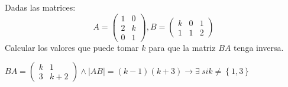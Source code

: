 \documentclass[addpoints,spanish, 12pt,a4paper]{exam}
\begin{document}
\begin{questions}

\question[1] Dadas las matrices:
$$A=\left(\begin{matrix}1 & 0\\2 & k\\0 & 1\end{matrix}\right) ,
 B=\left(\begin{matrix}k & 0 & 1\\1 & 1 & 2\end{matrix}\right)$$
Calcular los valores que puede tomar $k$ para que la matriz $BA$ tenga inversa.
\begin{solution}
$BA=\left(\begin{matrix}k & 1\\3 & k + 2\end{matrix}\right)
 \land |AB|=\left(k - 1\right) \left(k + 3\right)
 \to \exists \ si k\neq\left\{1,3\right\}$
\end{solution}


\end{questions}
\end{document}

